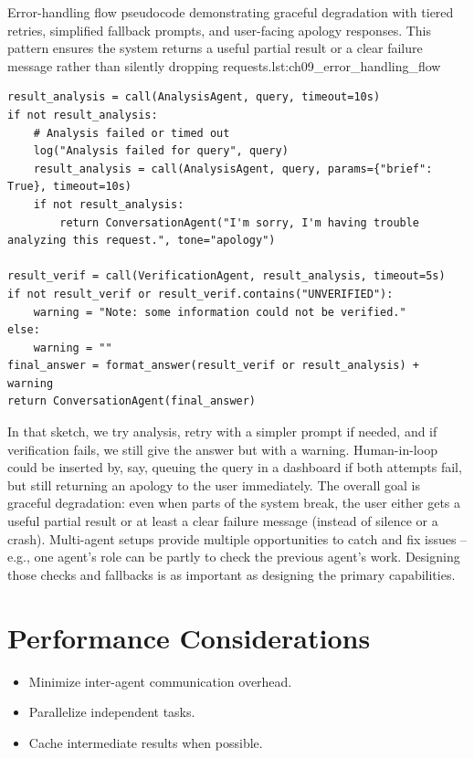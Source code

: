 \begin{codebox}{Error-handling flow pseudocode demonstrating graceful degradation with tiered retries, simplified fallback prompts, and user-facing apology responses. This pattern ensures the system returns a useful partial result or a clear failure message rather than silently dropping requests.}{lst:ch09_error_handling_flow}
\begin{verbatim}
result_analysis = call(AnalysisAgent, query, timeout=10s)
if not result_analysis:
    # Analysis failed or timed out
    log("Analysis failed for query", query)
    result_analysis = call(AnalysisAgent, query, params={"brief": True}, timeout=10s)
    if not result_analysis:
        return ConversationAgent("I'm sorry, I'm having trouble analyzing this request.", tone="apology")

result_verif = call(VerificationAgent, result_analysis, timeout=5s)
if not result_verif or result_verif.contains("UNVERIFIED"):
    warning = "Note: some information could not be verified."
else:
    warning = ""
final_answer = format_answer(result_verif or result_analysis) + warning
return ConversationAgent(final_answer)
\end{verbatim}
\end{codebox}

In that sketch, we try analysis, retry with a simpler prompt if needed, and if verification fails, we still give the answer but with a warning. Human-in-loop could be inserted by, say, queuing the query in a dashboard if both attempts fail, but still returning an apology to the user immediately. The overall goal is graceful degradation: even when parts of the system break, the user either gets a useful partial result or at least a clear failure message (instead of silence or a crash). Multi-agent setups provide multiple opportunities to catch and fix issues – e.g., one agent’s role can be partly to check the previous agent’s work. Designing those checks and fallbacks is as important as designing the primary capabilities.

\section{Performance Considerations}
\begin{itemize}
    \item Minimize inter-agent communication overhead.
    \item Parallelize independent tasks.
    \item Cache intermediate results when possible.
\end{itemize}



